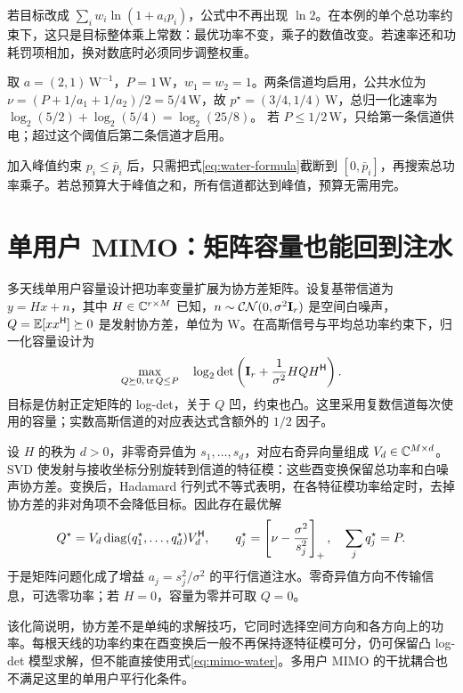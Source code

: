若目标改成 $\sum_i w_i\ln(1+a_i p_i)$，公式中不再出现 $\ln2$。在本例的单个总功率约束下，这只是目标整体乘上常数：最优功率不变，乘子的数值改变。若速率还和功耗罚项相加，换对数底时必须同步调整权重。

\begin{example}[两条信道的精确解]
取 $a=(2,1)\,\mathrm{W}^{-1}$，$P=1\,\mathrm W$，$w_1=w_2=1$。两条信道均启用，公共水位为
$\nu=(P+1/a_1+1/a_2)/2=5/4\,\mathrm W$，故
$p^\star=(3/4,1/4)\,\mathrm W$，总归一化速率为
$\log_2(5/2)+\log_2(5/4)=\log_2(25/8)$。
若 $P\leq1/2\,\mathrm W$，只给第一条信道供电；超过这个阈值后第二条信道才启用。
\end{example}

加入峰值约束 $p_i\leq\bar p_i$ 后，只需把式\eqref{eq:water-formula}截断到 $[0,\bar p_i]$，再搜索总功率乘子。若总预算大于峰值之和，所有信道都达到峰值，预算无需用完。

\section{单用户 MIMO：矩阵容量也能回到注水}
多天线单用户容量设计把功率变量扩展为协方差矩阵。设复基带信道为 $y=Hx+n$，其中 $H\in\mathbb C^{r\times M}$ 已知，$n\sim\mathcal{CN}(0,\sigma^2\mathbf I_r)$ 是空间白噪声，$Q=\mathbb E[xx^\mathsf H]\succeq0$ 是发射协方差，单位为 W。在高斯信号与平均总功率约束下，归一化容量设计为\cite{tse2005}
\begin{equation}
 \max_{Q\succeq0,\,\operatorname{tr} Q\leq P}\quad
 \log_2\det\left(\mathbf I_r+\frac1{\sigma^2}HQH^\mathsf H\right).
 \label{eq:mimo-logdet}
\end{equation}
目标是仿射正定矩阵的 log-det，关于 $Q$ 凹，约束也凸。这里采用复数信道每次使用的容量；实数高斯信道的对应表达式含额外的 $1/2$ 因子。

设 $H$ 的秩为 $d>0$，非零奇异值为 $s_1,\ldots,s_d$，对应右奇异向量组成 $V_d\in\mathbb C^{M\times d}$。SVD 使发射与接收坐标分别旋转到信道的特征模：这些酉变换保留总功率和白噪声协方差。变换后，Hadamard 行列式不等式表明，在各特征模功率给定时，去掉协方差的非对角项不会降低目标。因此存在最优解
\begin{equation}
 Q^\star=V_d\operatorname{diag}(q_1^\star,\ldots,q_d^\star)V_d^\mathsf H,
 \qquad q_j^\star=\left[\nu-\frac{\sigma^2}{s_j^2}\right]_+,
 \quad\sum_jq_j^\star=P.
 \label{eq:mimo-water}
\end{equation}
于是矩阵问题化成了增益 $a_j=s_j^2/\sigma^2$ 的平行信道注水。零奇异值方向不传输信息，可选零功率；若 $H=0$，容量为零并可取 $Q=0$。

该化简说明，协方差不是单纯的求解技巧，它同时选择空间方向和各方向上的功率。每根天线的功率约束在酉变换后一般不再保持逐特征模可分，仍可保留凸 log-det 模型求解，但不能直接使用式\eqref{eq:mimo-water}。多用户 MIMO 的干扰耦合也不满足这里的单用户平行化条件。

